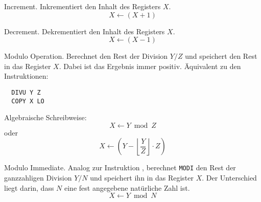 \glqq Increment\grqq.
Inkrementiert den Inhalt des Registers $X$.
\[
    X \gets ( X + 1 )
\]



\glqq Decrement\grqq.
Dekrementiert den Inhalt des Registers $X$.
\[
    X \gets ( X - 1 )
\]




Modulo Operation.
Berechnet den Rest der Division $Y/Z$ und speichert den Rest in das Register
$X$. Dabei ist das Ergebnis immer positiv.
Äquivalent zu den Instruktionen:
\begin{lstlisting}
  DIVU Y Z
  COPY X LO
\end{lstlisting}

Algebraische Schreibweise:
\[
    X \gets Y \bmod Z
\]
oder
\[
    X \gets \left(
      Y - \left\lfloor \frac{Y}{Z}  \right\rfloor \cdot Z
      \right)
\]


\glqq Modulo Immediate\grqq. Analog zur Instruktion , berechnet
\texttt{MODI} den Rest der ganzzahligen Division $Y / N$ und speichert ihn in
das Register $X$. Der Unterschied liegt darin, dass $N$ eine fest angegebene
natürliche Zahl ist.
\[
    X \gets Y \bmod N
\]

